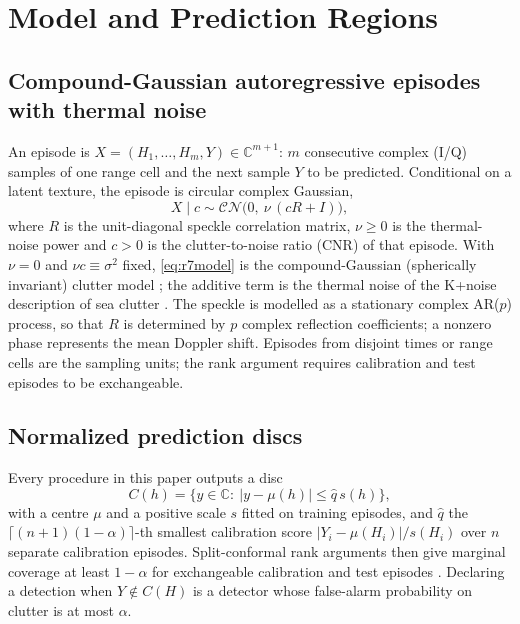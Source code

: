 \documentclass[journal]{IEEEtran}
\begin{document}
\section{Model and Prediction Regions}
\subsection{Compound-Gaussian autoregressive episodes with thermal noise}
An episode is $X=(H_1,\dots,H_m,Y)\in\mathbb{C}^{m+1}$: $m$ consecutive complex (I/Q) samples of one range cell and the next sample $Y$ to be predicted. Conditional on a latent texture, the episode is circular complex Gaussian,
\begin{equation}
X\mid c\sim\mathcal{CN}\big(0,\ \nu\,(cR+I)\big),
\label{eq:r7model}
\end{equation}
where $R$ is the unit-diagonal speckle correlation matrix, $\nu\ge0$ is the thermal-noise power and $c>0$ is the clutter-to-noise ratio (CNR) of that episode. With $\nu=0$ and $\nu c\equiv\sigma^2$ fixed, \eqref{eq:r7model} is the compound-Gaussian (spherically invariant) clutter model \cite{conte1995,ollila2012}; the additive term is the thermal noise of the K+noise description of sea clutter \cite{watts1987,ward2013}. The speckle is modelled as a stationary complex AR($p$) process, so that $R$ is determined by $p$ complex reflection coefficients; a nonzero phase represents the mean Doppler shift. Episodes from disjoint times or range cells are the sampling units; the rank argument requires calibration and test episodes to be exchangeable.

\subsection{Normalized prediction discs}
Every procedure in this paper outputs a disc
\begin{equation}
C(h)=\{y\in\mathbb C:\ |y-\mu(h)|\le \widehat q\,s(h)\},
\label{eq:disc}
\end{equation}
with a centre $\mu$ and a positive scale $s$ fitted on training episodes, and $\widehat q$ the $\lceil(n+1)(1-\alpha)\rceil$-th smallest calibration score $|Y_i-\mu(H_i)|/s(H_i)$ over $n$ separate calibration episodes. Split-conformal rank arguments then give marginal coverage at least $1-\alpha$ for exchangeable calibration and test episodes \cite{lei2018}. Declaring a detection when $Y\notin C(H)$ is a detector whose false-alarm probability on clutter is at most $\alpha$.
\end{document}
